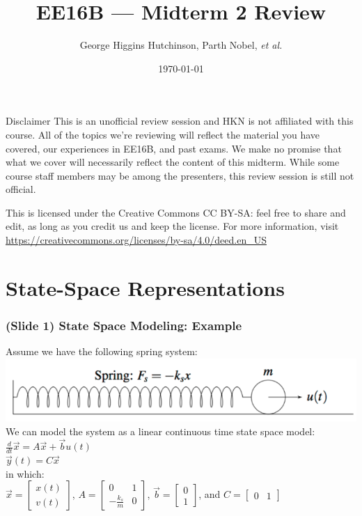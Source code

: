\documentclass{beamer}
\title{EE16B --- Midterm 2 Review}
\author{George Higgins Hutchinson, Parth Nobel, \textit{et al.}}
\date{\today}
\begin{document}
	\begin{frame}
		\titlepage
	\end{frame}

	\begin{frame}{Disclaimer}
	This is an unofficial review session and HKN is not affiliated with this course. All of the topics we're reviewing will reflect the material you have covered, our experiences in EE16B, and past exams. We make no promise that what we cover will necessarily reflect the content of this midterm. While some course staff members may be among the presenters, this review session is still not official.
	\vspace{1em}
	
	This is licensed under the Creative Commons CC BY-SA: feel free to share and edit, as long as you credit us and keep the license. For more information, visit \\ \small{\url{https://creativecommons.org/licenses/by-sa/4.0/deed.en_US}}
	
	\end{frame}

\section[State-Space]{State-Space Representations}

\begin{frame}
\frametitle{(Slide 1) State Space Modeling: Example}

Assume we have the following spring system: \\
\includegraphics[scale=0.5]{./images/spring.png} \\ \pause
We can model the system as a linear continuous time state space model: \\
$\frac{d}{dt}\vec{x} = A\vec{x} + \vec{b}u(t)$ \\
$\vec{y}(t) = C\vec{x}$ \\
in which: \\
$\vec{x} = 
\begin{bmatrix}
x(t) \\
v(t)
\end{bmatrix}$, 
$A = 
\begin{bmatrix}
0 & 1 \\
-\frac{k_{s}}{m} & 0
\end{bmatrix}$, 
$\vec{b} = 
\begin{bmatrix}
0 \\
1
\end{bmatrix}$, and
$C = 
\begin{bmatrix}
0 & 1
\end{bmatrix}$
\end{frame}
\end{document}
